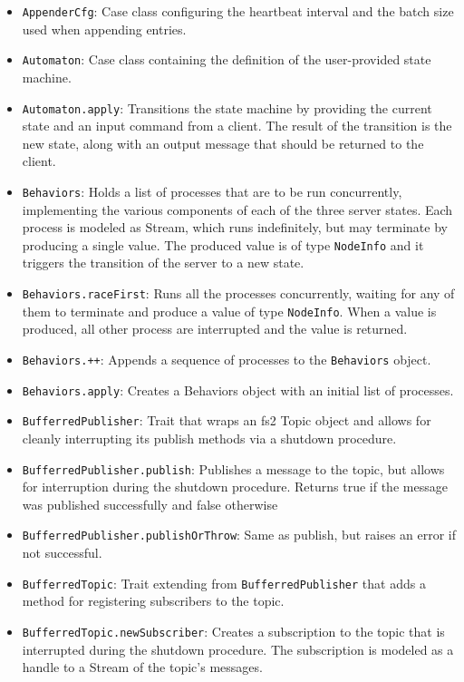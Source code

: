 \begin{itemize}
    \item \lstinline|AppenderCfg|: Case class configuring the heartbeat interval and the batch size used when appending entries.
    \item \lstinline|Automaton|: Case class containing the definition of the user-provided state machine.
    \item \lstinline|Automaton.apply|: Transitions the state machine by providing the current state and an input command from a client. The result of the transition is the new state, along with an output message that should be returned to the client.
    \item \lstinline|Behaviors|: Holds a list of processes that are to be run concurrently, implementing the various components of each of the three server states. Each process is modeled as Stream, which runs indefinitely, but may terminate by producing a single value. The produced value is of type \lstinline|NodeInfo| and it triggers the transition of the server to a new state.
    \item \lstinline|Behaviors.raceFirst|: Runs all the processes concurrently, waiting for any of them to terminate and produce a value of type \lstinline|NodeInfo|. When a value is produced, all other process are interrupted and the value is returned.
    \item \lstinline|Behaviors.++|: Appends a sequence of processes to the \lstinline|Behaviors| object.
    \item \lstinline|Behaviors.apply|: Creates a Behaviors object with an initial list of processes.
    \item \lstinline|BufferredPublisher|: Trait that wraps an fs2 Topic object and allows for cleanly interrupting its publish methods via a shutdown procedure.
    \item \lstinline|BufferredPublisher.publish|: Publishes a message to the topic, but allows for interruption during the shutdown procedure. Returns true if the message was published successfully and false otherwise
    \item \lstinline|BufferredPublisher.publishOrThrow|: Same as publish, but raises an error if not successful.
    \item \lstinline|BufferredTopic|: Trait extending from \lstinline|BufferredPublisher| that adds a method for registering subscribers to the topic.
    \item \lstinline|BufferredTopic.newSubscriber|: Creates a subscription to the topic that is interrupted during the shutdown procedure. The subscription is modeled as a handle to a Stream of the topic's messages.

\end{itemize}

